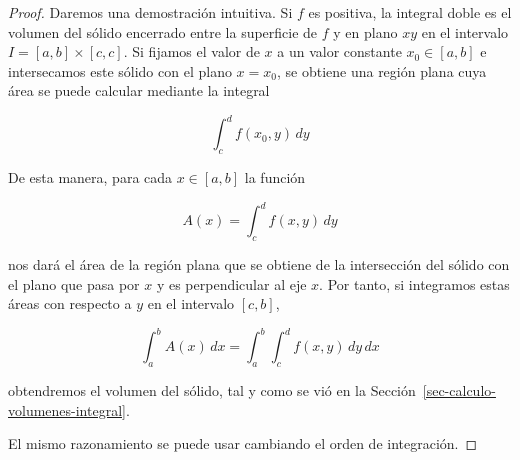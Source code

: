 \documentclass[
  a4paper,
]{scrreport}
\theoremstyle{definition}
\theoremstyle{definition}
\theoremstyle{definition}
\theoremstyle{plain}
\theoremstyle{plain}
\theoremstyle{plain}
\theoremstyle{remark}
\begin{document}
\begin{tcolorbox}[enhanced jigsaw, bottomtitle=1mm, title=\textcolor{quarto-callout-note-color}{\faInfo}\hspace{0.5em}{Demostración}, colbacktitle=quarto-callout-note-color!10!white, coltitle=black, leftrule=.75mm, colback=white, toptitle=1mm, toprule=.15mm, titlerule=0mm, opacitybacktitle=0.6, colframe=quarto-callout-note-color-frame, bottomrule=.15mm, arc=.35mm, rightrule=.15mm, breakable, left=2mm, opacityback=0]

\begin{proof}
Daremos una demostración intuitiva. Si \(f\) es positiva, la integral
doble es el volumen del sólido encerrado entre la superficie de \(f\) y
en plano \(xy\) en el intervalo \(I=[a,b]\times [c,c]\). Si fijamos el
valor de \(x\) a un valor constante \(x_0\in[a,b]\) e intersecamos este
sólido con el plano \(x=x_0\), se obtiene una región plana cuya área se
puede calcular mediante la integral

\[
\int_c^d f(x_0,y)\,dy
\]

De esta manera, para cada \(x\in[a,b]\) la función

\[
A(x) = \int_c^d f(x,y)\,dy
\]

nos dará el área de la región plana que se obtiene de la intersección
del sólido con el plano que pasa por \(x\) y es perpendicular al eje
\(x\). Por tanto, si integramos estas áreas con respecto a \(y\) en el
intervalo \([c,b]\),

\[
\int_a^b A(x)\,dx = \int_a^b\int_c^d f(x,y)\,dy\,dx
\]

obtendremos el volumen del sólido, tal y como se vió en la
Sección~\ref{sec-calculo-volumenes-integral}.

El mismo razonamiento se puede usar cambiando el orden de integración.
\end{proof}

\end{tcolorbox}
\end{document}
